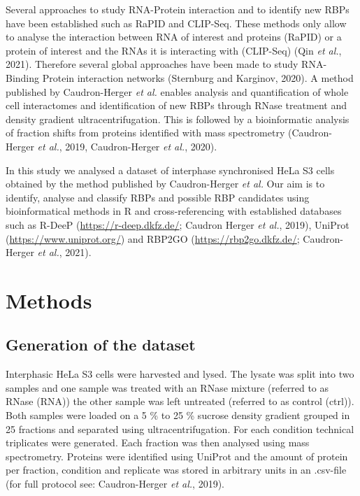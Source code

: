 \documentclass[
]{article}
\begin{document}
Several approaches to study RNA-Protein interaction and to identify new
RBPs have been established such as RaPID and CLIP-Seq. These methods
only allow to analyse the interaction between RNA of interest and
proteins (RaPID) or a protein of interest and the RNAs it is interacting
with (CLIP-Seq) (Qin \emph{et al.}, 2021). Therefore several global
approaches have been made to study RNA-Binding Protein interaction
networks (Sternburg and Karginov, 2020). A method published by
Caudron-Herger \emph{et al.} enables analysis and quantification of
whole cell interactomes and identification of new RBPs through RNase
treatment and density gradient ultracentrifugation. This is followed by
a bioinformatic analysis of fraction shifts from proteins identified
with mass spectrometry (Caudron-Herger \emph{et al.}, 2019,
Caudron-Herger \emph{et al.}, 2020).

In this study we analysed a dataset of interphase synchronised HeLa S3
cells obtained by the method published by Caudron-Herger \emph{et al.}
Our aim is to identify, analyse and classify RBPs and possible RBP
candidates using bioinformatical methods in R and cross-referencing with
established databases such as R-DeeP (\url{https://r-deep.dkfz.de/};
Caudron Herger \emph{et al.}, 2019), UniProt
(\url{https://www.uniprot.org/}) and RBP2GO
(\url{https://rbp2go.dkfz.de/}; Caudron-Herger \emph{et al.}, 2021).

\newpage

\hypertarget{methods}{%
\section{Methods}\label{methods}}

\hypertarget{generation-of-the-dataset}{%
\subsection{Generation of the dataset}\label{generation-of-the-dataset}}

Interphasic HeLa S3 cells were harvested and lysed. The lysate was split
into two samples and one sample was treated with an RNase mixture
(referred to as RNase (RNA)) the other sample was left untreated
(referred to as control (ctrl)). Both samples were loaded on a 5 \% to
25 \% sucrose density gradient grouped in 25 fractions and separated
using ultracentrifugation. For each condition technical triplicates were
generated. Each fraction was then analysed using mass spectrometry.
Proteins were identified using UniProt and the amount of protein per
fraction, condition and replicate was stored in arbitrary units in an
.csv-file (for full protocol see: Caudron-Herger \emph{et al.}, 2019).
\end{document}
